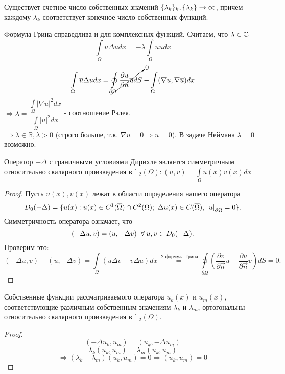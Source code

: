 \begin{statement}
Существует счетное число собственных значений $\{\lambda_k\}_k,  \\ \{\lambda_k\} \to \infty$, причем каждому $\lambda_k$ соответствует конечное число собственных функций.
\end{statement} 
Формула Грина справедлива и для комплексных функций. Считаем, что $\lambda \in \mathbb{C}$
$$
\int\limits_{\Omega} \overline{u} \Delta u dx = - \lambda \int\limits_{\Omega} u \overline{u} dx$$
$$
\int\limits_{\Omega} \overline{u} \Delta u dx = \cancelto{0}{\oint\limits_{\partial \Omega} \frac{\partial u}{\partial \vec{n}} \overline{u} dS }- \int\limits_{\Omega} (\nabla u, \nabla \overline{u}) dx$$
$\Rightarrow \lambda = \dfrac{\int\limits_{\Omega}|\nabla u|^2 dx}{\int\limits_{\Omega}|u|^2 dx}$ - соотношение Рэлея.\\
$\Rightarrow \lambda \in \mathbb{R}, \lambda >0 $ (строго больше, т.к. $\nabla u = 0 \Rightarrow u =0$). В задаче Неймана $\lambda = 0$ возможно.\\
\begin{statement} Оператор $-\Delta$ с граничными условиями Дирихле является симметричным относительно скалярного произведения в $\mathbb{L}_2(\Omega): (u,v) = \int\limits_{\Omega} u(x) \overline{v}(x)dx $ 
\end{statement}
\begin{proof}
Пусть $u(x), v(x)$ лежат в области  определения нашего оператора $$D_0(-\Delta) = \{u(x): u(x) \in C^1(\overline{\Omega}) \cap C^2(\Omega); \ \Delta u(x) \in C(\overline{\Omega}), \ \left. u\right|_{\partial \Omega} = 0 \}.$$
Симметричность оператора означает, что $$(-\Delta u,v)=(u, -\Delta v) \;\;\forall\: u,v \in D_0(-\Delta).$$ Проверим это: $$ (-\Delta u,v) - (u, -\Delta v) = \int\limits_{\Omega} (u \Delta v- v \Delta u)dx \stackrel{\text{ 2 формула Грина}}{=} \oint \limits_{\partial \Omega} ( \frac{\partial v}{\partial \vec{n}}u - \frac{\partial u}{\partial \vec{n}}v) dS =0.$$
\end{proof}
\begin{statement} Собственные функции рассматриваемого оператора $u_k(x)$ и $u_m(x)$, соответствующие различным собственным значениям $\lambda_k$ и $\lambda_m$, ортогональны относительно скалярного произведения в $\mathbb{L}_2(\Omega)$.
\end{statement}
\begin{proof}
$$(-\Delta u_k, u_m) = (u_k, -\Delta u_m)$$ $$\lambda_k (u_k, u_m)=  \lambda_m (u_k, u_m)$$ $$\Rightarrow (\lambda_k - \lambda_m) (u_k, u_m) = 0 \Rightarrow (u_k, u_m) = 0 $$
\end{proof}
 
 